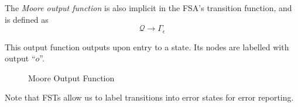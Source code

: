 \begin{definition}
    The \textit{Moore output function} is also implicit in the FSA's transition function, and is defined as
    \begin{equation}
        \mathcal{Q} \to \Gamma_{\epsilon}
    \end{equation}
    
    This output function outputs upon entry to a state. Its nodes are labelled with output \enquote{$o$}.
    
    \begin{figure}[H]
        \centering
        \caption{Moore Output Function}
        \label{fig:fst-moore}
    \end{figure}
\end{definition}

\begin{remark}
    Note that FSTs allow us to label transitions into error states for error reporting.
\end{remark}
